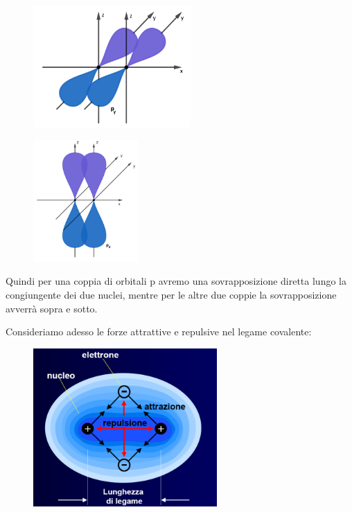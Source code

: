\hspace{1cm}\begin{minipage}{0.5\textwidth}
    \begin{figure}[H]
        \includegraphics[width=6cm]{immagini/orbitali_py.png}
    \end{figure}
    \end{minipage} \hfill
    \begin{minipage}{0.5\textwidth}
    \begin{figure}[H]
        \includegraphics[width=4cm]{immagini/orbitali_pz.png}
    \end{figure}
    \end{minipage}

Quindi per una coppia di orbitali p avremo una sovrapposizione diretta lungo la congiungente dei due nuclei, mentre per le altre due coppie la sovrapposizione avverrà sopra e sotto.

\vspace{0.2cm}Consideriamo adesso le forze attrattive e repulsive nel legame covalente:

\begin{figure}[H]
    \centering
    \includegraphics[width=7cm]{immagini/forze_legame_covalente.png}
\end{figure}
 
